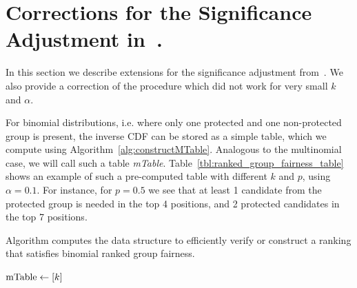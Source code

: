 \section{Corrections for the Significance Adjustment in~\cite{zehlike2017fair}. }
\label{sec:adjustment-binomial}
%
In this section we describe extensions for the significance adjustment from~\cite{zehlike2017fair}.
%
We also provide a correction of the procedure which did not work for very small $k$ and $\alpha$. 

For binomial distributions, i.e. where only one protected and one non-protected group is present, the inverse CDF can be stored as a simple table, which we compute using Algorithm~\ref{alg:constructMTable}. 
%
Analogous to the multinomial case, we will call such a table \textit{mTable}.
%
Table~\ref{tbl:ranked_group_fairness_table} shows an example of such a pre-computed table with different $ k $ and $ p $, using $\alpha=0.1$.
%
For instance, for $p=0.5$ we see that at least 1 candidate from the protected group is needed in the top 4 positions, and 2 protected candidates in the top 7 positions.
\begin{algorithm}[h]
	\caption{Algorithm \algoMtable computes the data structure to efficiently verify or construct a ranking that satisfies binomial ranked group fairness.}
	\label{alg:constructMTable}
	\small
	$\operatorname{mTable} \leftarrow [k]$  
	\Return{$ \mtable $ }
\end{algorithm}

